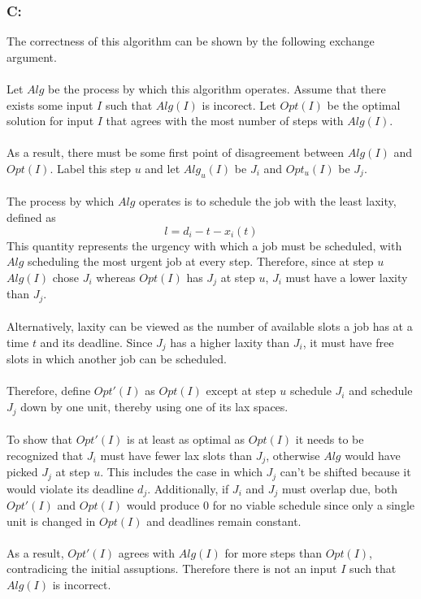 \documentclass[12pt]{article}
\begin{document}
\subsubsection*{C:}
The correctness of this algorithm can be shown by the following exchange argument.\\\\ 
Let $Alg$ be the process by which this algorithm operates.
Assume that there exists some input $I$ such that $Alg(I)$ is incorect.  Let $Opt(I)$
be the optimal solution for input $I$ that agrees with the most number of steps with
$Alg(I)$.\\\\
As a result, there must be some first point of disagreement between $Alg(I)$ and $Opt(I)$.
Label this step $u$ and let $Alg_u(I)$ be $J_i$ and $Opt_u(I)$ be $J_j$.\\\\
The process by which $Alg$ operates is to schedule the job with the least laxity, defined as
\[
l = d_i - t - x_i(t)
\]   
This quantity represents the urgency with which a job must be scheduled, with $Alg$ scheduling
the most urgent job at every step.  Therefore, since at step $u$ $Alg(I)$ chose $J_i$ whereas
$Opt(I)$ has $J_j$ at step $u$, $J_i$ must have a lower laxity than $J_j$.\\\\
Alternatively, laxity can be viewed as the number of available slots a job has at a time $t$
and its deadline.  Since $J_j$ has a higher laxity than $J_i$, it must have free slots in which
another job can be scheduled.\\\\
Therefore, define $Opt'(I)$ as $Opt(I)$ except at step $u$ schedule $J_i$ and schedule $J_j$ down
by one unit, thereby using one of its lax spaces.\\\\
To show
that $Opt'(I)$ is at least as optimal as $Opt(I)$ it needs to be recognized that $J_i$ must have
fewer lax slots than $J_j$, otherwise $Alg$ would have picked $J_j$ at step $u$.  This includes
the case in which $J_j$ can't be shifted because it would violate its deadline $d_j$.  Additionally,
if $J_i$ and $J_j$ must overlap due, both $Opt'(I)$ and $Opt(I)$ would produce $0$ for no viable
schedule since only a single unit is changed in $Opt(I)$ and deadlines remain constant.\\\\
As a result,
$Opt'(I)$ agrees with $Alg(I)$ for more steps than $Opt(I)$, contradicing the initial assuptions. 
Therefore there is not an input $I$ such that $Alg(I)$ is incorrect.  
\end{document}
